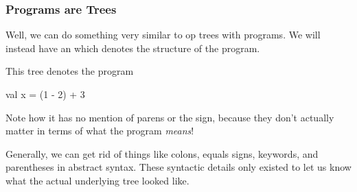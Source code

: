 \documentclass[aspectratio=169, handout]{beamer}
\begin{document}
\begin{frame}[fragile]
  \frametitle{Programs are Trees}

  Well, we can do something very similar to op trees with programs. We will
  instead have an  which denotes the structure
  of the program.

  \pause
  \vspace{\fill}

  \begin{center}
    \begin{minipage}{0.6\textwidth}
      \raggedright
      This tree denotes the program
      \begin{codeblock}
        val x = (1 - 2) + 3
      \end{codeblock}

      Note how it has no mention of parens or the \code{=} sign, because they don't
      actually matter in terms of what the program \textit{means}!

      Generally, we can get rid of things like colons, equals signs, keywords,
      and parentheses in abstract syntax. These syntactic details only existed
      to let us know what the actual underlying tree looked like.
    \end{minipage}
    \begin{minipage}{0.38\textwidth}
      \centering
    \end{minipage}
  \end{center}
\end{frame}
\end{document}

